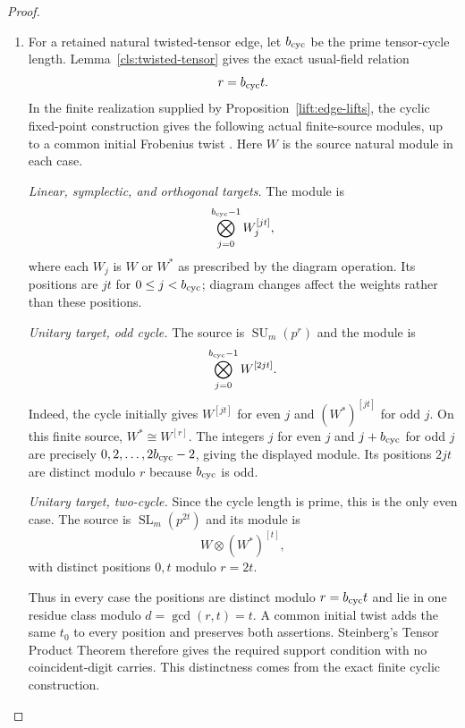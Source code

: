 \begin{proof}
\begin{enumerate}[label=\textup{(\alph*)}]
      \[
                         N\oplus N^{[r]}
                         \cong N\oplus N^*.
      \]
      Both positions are zero modulo $r$; this repetition
      causes no tensor carry because the operation is a
      direct sum.
\item For a retained natural twisted-tensor edge, let
      $b_{\rm cyc}$ be the prime tensor-cycle length.
      Lemma~\ref{cls:twisted-tensor} gives the exact usual-field
      relation
      \[
                           r=b_{\rm cyc}t.
      \]
      In the finite realization supplied by
      Proposition~\ref{lift:edge-lifts}, the cyclic fixed-point
      construction gives the following actual finite-source
      modules, up to a common initial Frobenius twist
      \cite[Proposition~2.8(ii) and Section~4(5), p.~449]
      {LiebeckSeitzClassical1998}.
      Here $W$ is the source natural module in each case.

      \emph{Linear, symplectic, and orthogonal targets.}
      The module is
      \[
                   \bigotimes_{j=0}^{b_{\rm cyc}-1}W_j^{[jt]},
      \]
      where each $W_j$ is $W$ or $W^*$ as prescribed by the
      diagram operation.  Its positions are $jt$ for
      $0\le j<b_{\rm cyc}$; diagram changes affect the
      weights rather than these positions.

      \emph{Unitary target, odd cycle.}
      The source is $\operatorname{SU}_m(p^r)$ and the module is
      \[
                   \bigotimes_{j=0}^{b_{\rm cyc}-1}W^{[2jt]}.
      \]
      Indeed, the cycle initially gives $W^{[jt]}$ for even
      $j$ and $(W^*)^{[jt]}$ for odd $j$.  On this finite source,
      $W^*\cong W^{[r]}$.  The integers $j$ for even $j$ and
      $j+b_{\rm cyc}$ for odd $j$ are precisely
      $0,2,\ldots,2b_{\rm cyc}-2$, giving the displayed module.
      Its positions $2jt$ are distinct modulo $r$ because
      $b_{\rm cyc}$ is odd.

      \emph{Unitary target, two-cycle.}
      Since the cycle length is prime, this is the only even
      case.  The source is $\operatorname{SL}_m(p^{2t})$ and
      its module is
      \[
                             W\otimes(W^*)^{[t]},
      \]
      with distinct positions $0,t$ modulo $r=2t$.

      Thus in every case the positions are distinct modulo
      $r=b_{\rm cyc}t$ and lie in one residue class modulo
      $d=\gcd(r,t)=t$.  A common initial twist adds the same
      $t_0$ to every position and preserves both assertions.
      Steinberg's Tensor Product Theorem therefore gives the
      required support condition with no coincident-digit
      carries.  This distinctness comes from the exact finite
      cyclic construction.


\end{enumerate}
\end{proof}
